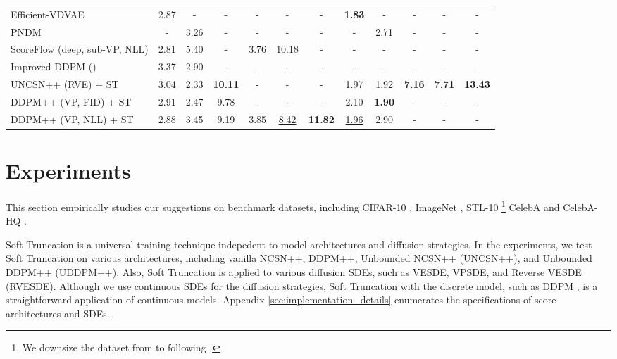 \documentclass[nohyperref]{article}
\theoremstyle{plain}
\theoremstyle{definition}
\theoremstyle{remark}
\begin{document}
\begin{table*}
\begin{adjustbox}{max width=\textwidth}
\begin{tabular}{lccccccccccc}
			Efficient-VDVAE \citep{hazami2022efficient} & 2.87 & - & - & - & - & - & \textbf{1.83} & - & - & - & - \\
			PNDM \citep{liu2022pseudo} & - & 3.26 & - & - & - & - & - & 2.71 & - & - & - \\
			ScoreFlow (deep, sub-VP, NLL) \citep{song2021maximum} & 2.81 & 5.40 & - & 3.76 & 10.18 & - & - & - & - & - & - \\
			Improved DDPM () \citep{nichol2021improved} & 3.37 & 2.90 & - & - & - & - & - & - & - & - & - \\\midrule
			UNCSN++ (RVE) + ST & 3.04 & 2.33 & \textbf{10.11} & - & - & - & 1.97 & \underline{1.92} & \textbf{7.16} & \textbf{7.71} & \textbf{13.43} \\
			DDPM++ (VP, FID) + ST & 2.91 & 2.47 & 9.78 & - & - & - & 2.10 & \textbf{1.90} & - & - & - \\
			DDPM++ (VP, NLL) + ST & 2.88 & 3.45 & 9.19 & 3.85 & \underline{8.42} & \textbf{11.82} & \underline{1.96} & 2.90 & - & - & - \\
			\bottomrule
		\end{tabular}
	\end{adjustbox}
\end{table*}

\section{Experiments}

This section empirically studies our suggestions on benchmark datasets, including CIFAR-10 \citep{krizhevsky2009learning}, ImageNet  \cite{van2016pixel}, STL-10 \citep{coates2011analysis}\footnote{We downsize the dataset from  to  following \citet{jiang2021transgan, park2021styleformer}.} CelebA \citep{liu2015deep}  and CelebA-HQ \citep{karras2018progressive} .

Soft Truncation is a universal training technique indepedent to model architectures and diffusion strategies. In the experiments, we test Soft Truncation on various architectures, including vanilla NCSN++, DDPM++, Unbounded NCSN++ (UNCSN++), and Unbounded DDPM++ (UDDPM++). Also, Soft Truncation is applied to various diffusion SDEs, such as VESDE, VPSDE, and Reverse VESDE (RVESDE). Although we use continuous SDEs for the diffusion strategies, Soft Truncation with the discrete model, such as DDPM \cite{ho2020denoising}, is a straightforward application of continuous models. Appendix \ref{sec:implementation_details} enumerates the specifications of score architectures and SDEs.
\end{document}
